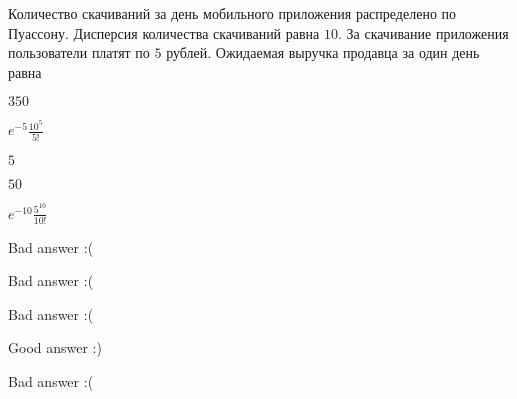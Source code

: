 
\begin{question}
Количество скачиваний за день мобильного приложения распределено по
Пуассону. Дисперсия количества скачиваний равна \(10\). За скачивание
приложения пользователи платят по \(5\) рублей. Ожидаемая выручка
продавца за один день равна
\begin{answerlist}
  \item \(350\)
  \item \(e^{-5}\frac{10^{5}}{5!}\)
  \item \(5\)
  \item \(50\)
  \item \(e^{-10}\frac{5^{10}}{10!}\)
\end{answerlist}
\end{question}

\begin{solution}
\begin{answerlist}
  \item Bad answer :(
  \item Bad answer :(
  \item Bad answer :(
  \item Good answer :)
  \item Bad answer :(
\end{answerlist}
\end{solution}

